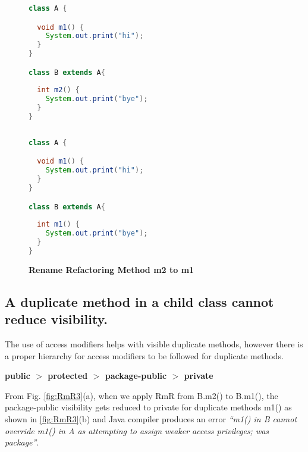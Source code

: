 \begin{figure}[th]
\centering
\begin{minipage}[t]{0.47\linewidth}
\begin{lstlisting}[language=java, basicstyle=\scriptsize\ttfamily,frame=single]
class A {

  void m1() {
    System.out.print("hi");
  }
}

class B extends A{
 
  int m2() {
    System.out.print("bye");
  }	
}
 
\end{lstlisting}
\end{minipage}
\hfill
\begin{minipage}[t]{0.47\linewidth}
\begin{lstlisting}[language=java, basicstyle=\scriptsize\ttfamily,frame=single]
class A {

  void m1() {
    System.out.print("hi");
  }
}

class B extends A{
 
  int m1() {
    System.out.print("bye");
  }	
}

\end{lstlisting}
\end{minipage}
\caption{\textbf{Rename Refactoring Method m2 to m1}}
\label{fig:RmR2}
\end{figure}

\subsection{A duplicate method in a child class cannot reduce visibility.}

The use of access modifiers helps with visible duplicate methods, however there is a proper hierarchy for access modifiers to be followed for duplicate methods.


\begin{center}
\textbf{public $>$ protected $>$ package-public $>$ private}
\end{center}


From Fig. \ref{fig:RmR3}(a), when we apply RmR from B.m2() to B.m1(), the package-public visibility gets reduced to private for duplicate methods m1() as shown in \ref{fig:RmR3}(b) and Java compiler produces an error \textsl{``m1() in B cannot override m1() in A as attempting to assign weaker access privileges; was package''}. 

